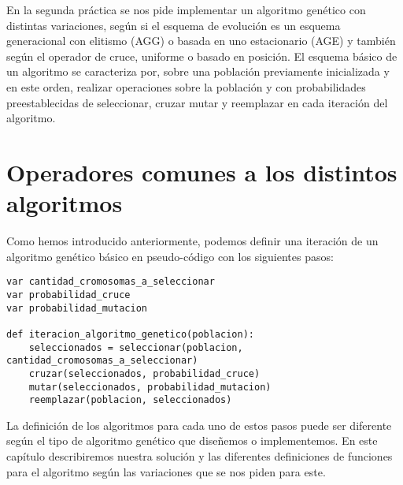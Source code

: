 En la segunda práctica se nos pide implementar un algoritmo genético con distintas variaciones,
según si el esquema de evolución es un esquema generacional con elitismo (AGG) o basada en
uno estacionario (AGE) y también según el operador de cruce, uniforme o basado en posición.
El esquema básico de un algoritmo se caracteriza por, sobre una población previamente inicializada
y en este orden, realizar operaciones sobre la población y con probabilidades preestablecidas
de seleccionar, cruzar mutar y reemplazar en cada iteración del algoritmo.

\section{Operadores comunes a los distintos algoritmos}

Como hemos introducido anteriormente, podemos definir una iteración de un algoritmo genético básico en pseudo-código
con los siguientes pasos:

\begin{minipage}{\textwidth}
\begin{lstlisting}[mathescape=true,caption={Esquema general de un algoritmo genético.},captionpos=b]
var cantidad_cromosomas_a_seleccionar
var probabilidad_cruce
var probabilidad_mutacion

def iteracion_algoritmo_genetico(poblacion):
	seleccionados = seleccionar(poblacion, cantidad_cromosomas_a_seleccionar)
	cruzar(seleccionados, probabilidad_cruce)
	mutar(seleccionados, probabilidad_mutacion)
	reemplazar(poblacion, seleccionados)
\end{lstlisting}
\end{minipage}

La definición de los algoritmos para cada uno de estos pasos puede ser diferente según el tipo de
algoritmo genético que diseñemos o implementemos. En este capítulo describiremos nuestra solución
y las diferentes definiciones de funciones para el algoritmo según las variaciones que se nos piden
para este.

